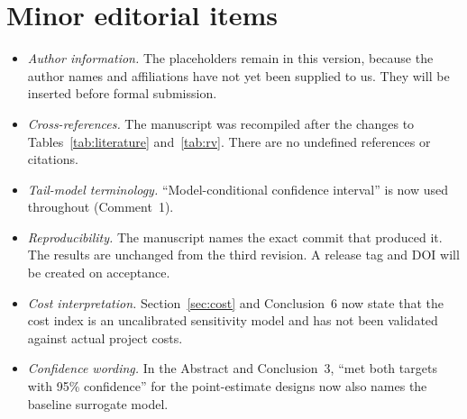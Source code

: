 \documentclass[11pt]{article}
\begin{document}
\section*{Minor editorial items}
\begin{itemize}[itemsep=0.2em]
\item \emph{Author information.} The placeholders remain in this version, because the author names
and affiliations have not yet been supplied to us. They will be inserted before formal submission.
\item \emph{Cross-references.} The manuscript was recompiled after the changes to
Tables~\ref{tab:literature} and~\ref{tab:rv}. There are no undefined references or citations.
\item \emph{Tail-model terminology.} ``Model-conditional confidence interval'' is now used throughout
(Comment~1).
\item \emph{Reproducibility.} The manuscript names the exact commit that produced it. The results are
unchanged from the third revision. A release tag and DOI will be created on acceptance.
\item \emph{Cost interpretation.} Section~\ref{sec:cost} and Conclusion~6 now state that the cost
index is an uncalibrated sensitivity model and has not been validated against actual project costs.
\item \emph{Confidence wording.} In the Abstract and Conclusion~3, ``met both targets with 95\%
confidence'' for the point-estimate designs now also names the baseline surrogate model.
\end{itemize}
\end{document}
